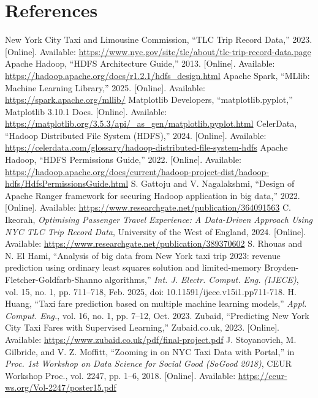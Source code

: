\documentclass[conference]{IEEEtran}
\begin{document}
\section{References}
\begin{thebibliography}{15}
New York City Taxi and Limousine Commission, ``TLC Trip Record Data,'' 2023. [Online]. Available: \url{https://www.nyc.gov/site/tlc/about/tlc-trip-record-data.page}
Apache Hadoop, ``HDFS Architecture Guide,'' 2013. [Online]. Available: \url{https://hadoop.apache.org/docs/r1.2.1/hdfs_design.html}
Apache Spark, ``MLlib: Machine Learning Library,'' 2025. [Online]. Available: \url{https://spark.apache.org/mllib/}
Matplotlib Developers, ``matplotlib.pyplot,'' Matplotlib 3.10.1 Docs. [Online]. Available: \url{https://matplotlib.org/3.5.3/api/_as_gen/matplotlib.pyplot.html}
CelerData, ``Hadoop Distributed File System (HDFS),'' 2024. [Online]. Available: \url{https://celerdata.com/glossary/hadoop-distributed-file-system-hdfs}
Apache Hadoop, ``HDFS Permissions Guide,'' 2022. [Online]. Available: \url{https://hadoop.apache.org/docs/current/hadoop-project-dist/hadoop-hdfs/HdfsPermissionsGuide.html}
S. Gattoju and V. Nagalakshmi, ``Design of Apache Ranger framework for securing Hadoop application in big data,'' 2022. [Online]. Available: \url{https://www.researchgate.net/publication/364091563}
C. Ikeorah, \textit{Optimising Passenger Travel Experience: A Data-Driven Approach Using NYC TLC Trip Record Data}, University of the West of England, 2024. [Online]. Available: \url{https://www.researchgate.net/publication/389370602}
S. Rhouas and N. El Hami, ``Analysis of big data from New York taxi trip 2023: revenue prediction using ordinary least squares solution and limited-memory Broyden-Fletcher-Goldfarb-Shanno algorithms,'' \textit{Int. J. Electr. Comput. Eng. (IJECE)}, vol. 15, no. 1, pp. 711--718, Feb. 2025, doi: 10.11591/ijece.v15i1.pp711-718.
H. Huang, ``Taxi fare prediction based on multiple machine learning models,'' \textit{Appl. Comput. Eng.}, vol. 16, no. 1, pp. 7--12, Oct. 2023.
Zubaid, ``Predicting New York City Taxi Fares with Supervised Learning,'' Zubaid.co.uk, 2023. [Online]. Available: \url{https://www.zubaid.co.uk/pdf/final-project.pdf}
J. Stoyanovich, M. Gilbride, and V. Z. Moffitt, ``Zooming in on NYC Taxi Data with Portal,'' in \textit{Proc. 1st Workshop on Data Science for Social Good (SoGood 2018)}, CEUR Workshop Proc., vol. 2247, pp. 1--6, 2018. [Online]. Available: \url{https://ceur-ws.org/Vol-2247/poster15.pdf}

\end{thebibliography}
\end{document}
